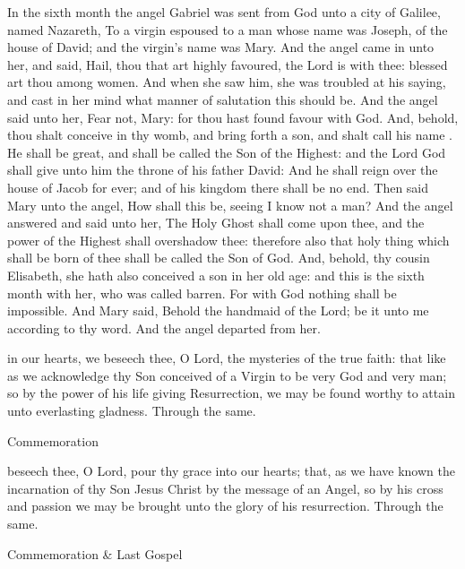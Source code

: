  In the sixth month the angel Gabriel was sent from God unto a city of Galilee, named Nazareth, To a virgin espoused to a man whose name was Joseph, of the house of David; and the virgin's name was Mary. And the angel came in unto her, and said, Hail, thou that art highly favoured, the Lord is with thee: blessed art thou among women. And when she saw him, she was troubled at his saying, and cast in her mind what manner of salutation this should be. And the angel said unto her, Fear not, Mary: for thou hast found favour with God. And, behold, thou shalt conceive in thy womb, and bring forth a son, and shalt call his name . He shall be great, and shall be called the Son of the Highest: and the Lord God shall give unto him the throne of his father David: And he shall reign over the house of Jacob for ever; and of his kingdom there shall be no end. Then said Mary unto the angel, How shall this be, seeing I know not a man? And the angel answered and said unto her, The Holy Ghost shall come upon thee, and the power of the Highest shall overshadow thee: therefore also that holy thing which shall be born of thee shall be called the Son of God. And, behold, thy cousin Elisabeth, she hath also conceived a son in her old age: and this is the sixth month with her, who was called barren. For with God nothing shall be impossible. And Mary said, Behold the handmaid of the Lord; be it unto me according to thy word. And the angel departed from her.


\secret
{} in our hearts, we beseech thee, O Lord, the mysteries of the true faith: that like as we acknowledge thy Son conceived of a Virgin to be very God and very man; so by the power of his life giving Resurrection, we may be found worthy to attain unto everlasting gladness. Through the same.
\begin{rubric}
    Commemoration %
\end{rubric}


\postcommunion
{} beseech thee, O Lord, pour thy grace into our hearts; that, as we have known the incarnation of thy Son Jesus Christ by the message of an Angel, so by his cross and passion we may be brought unto the glory of his resurrection. Through the same.
\begin{rubric}
    Commemoration \& Last Gospel 
\end{rubric}


